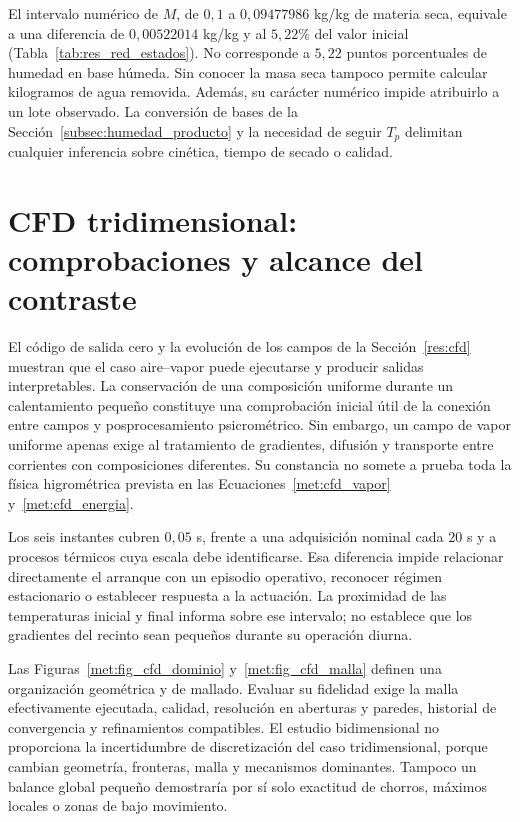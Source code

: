 El intervalo numérico de $M$, de $0{,}1$ a $0{,}09477986$ kg/kg de materia seca, equivale a una diferencia de $0{,}00522014$ kg/kg y al $5{,}22\%$ del valor inicial (Tabla~\ref{tab:res_red_estados}). No corresponde a $5{,}22$ puntos porcentuales de humedad en base húmeda. Sin conocer la masa seca tampoco permite calcular kilogramos de agua removida. Además, su carácter numérico impide atribuirlo a un lote observado. La conversión de bases de la Sección~\ref{subsec:humedad_producto} y la necesidad de seguir $T_p$ delimitan cualquier inferencia sobre cinética, tiempo de secado o calidad.
\FloatBarrier

\section{CFD tridimensional: comprobaciones y alcance del contraste}
\label{dis:cfd}

El código de salida cero y la evolución de los campos de la Sección~\ref{res:cfd} muestran que el caso aire--vapor puede ejecutarse y producir salidas interpretables. La conservación de una composición uniforme durante un calentamiento pequeño constituye una comprobación inicial útil de la conexión entre campos y posprocesamiento psicrométrico. Sin embargo, un campo de vapor uniforme apenas exige al tratamiento de gradientes, difusión y transporte entre corrientes con composiciones diferentes. Su constancia no somete a prueba toda la física higrométrica prevista en las Ecuaciones~\eqref{met:cfd_vapor} y~\eqref{met:cfd_energia}.

Los seis instantes cubren $0{,}05$ s, frente a una adquisición nominal cada $20$ s y a procesos térmicos cuya escala debe identificarse. Esa diferencia impide relacionar directamente el arranque con un episodio operativo, reconocer régimen estacionario o establecer respuesta a la actuación. La proximidad de las temperaturas inicial y final informa sobre ese intervalo; no establece que los gradientes del recinto sean pequeños durante su operación diurna.

Las Figuras~\ref{met:fig_cfd_dominio} y~\ref{met:fig_cfd_malla} definen una organización geométrica y de mallado. Evaluar su fidelidad exige la malla efectivamente ejecutada, calidad, resolución en aberturas y paredes, historial de convergencia y refinamientos compatibles. El estudio bidimensional no proporciona la incertidumbre de discretización del caso tridimensional, porque cambian geometría, fronteras, malla y mecanismos dominantes. Tampoco un balance global pequeño demostraría por sí solo exactitud de chorros, máximos locales o zonas de bajo movimiento.

